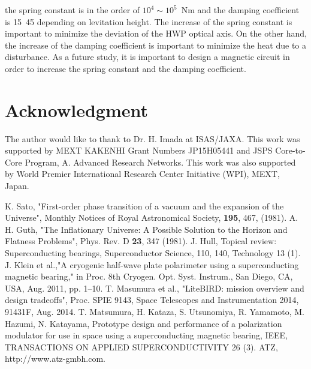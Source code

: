 \documentclass[a4paper]{jpconf}
\begin{document}
the spring constant is in the order of $10^{4} \sim 10^{5}$~Nm and the damping coefficient is 15~45 depending on levitation height.
The increase of the spring constant is important to minimize the deviation of the HWP optical axis.
On the other hand, the increase of the damping coefficient is important to minimize the heat due to a disturbance.
As a future study, it is important to design a magnetic circuit in order to increase the spring constant and the damping coefficient.

\section*{Acknowledgment}
The author would like to thank to Dr. H. Imada at ISAS/JAXA.
This work was supported by MEXT KAKENHI Grant Numbers JP15H05441 and JSPS Core-to-Core Program, A. Advanced Research Networks.
This work was also supported by World Premier International Research Center Initiative (WPI), MEXT, Japan.


\vspace*{5mm}
\begin{thebibliography}{99}

 K. Sato, "First-order phase transition of a vacuum and the expansion of the Universe", Monthly Notices of Royal Astronomical Society, {\bf 195}, 467, (1981).
A. H. Guth, "The Inflationary Universe: A Possible Solution to the Horizon and Flatness Problems", Phys. Rev. D {\bf 23}, 347 (1981).
J. Hull, Topical review: Superconducting bearings, Superconductor Science, 110, 140, Technology 13 (1).
J. Klein et al.,"A cryogenic half-wave plate polarimeter using a superconducting magnetic bearing," in Proc. 8th Cryogen. Opt. Syst. Instrum., San Diego, CA, USA, Aug. 2011, pp. 1–10.
T. Masumura et al., "LiteBIRD: mission overview and design tradeoffs", Proc. SPIE 9143, Space Telescopes and Instrumentation 2014, 91431F, Aug. 2014.
T. Matsumura, H. Kataza, S. Utsunomiya, R. Yamamoto, M. Hazumi, N. Katayama, Prototype design and performance of a polarization modulator for use in space using a superconducting magnetic bearing, IEEE, TRANSACTIONS ON APPLIED SUPERCONDUCTIVITY 26 (3).
ATZ, http://www.atz-gmbh.com.
\end{thebibliography}
\end{document}
